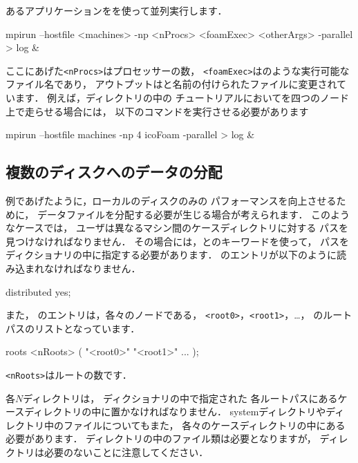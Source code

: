 あるアプリケーションをを使って並列実行します．
\begin{OFverbatim}[terminal]
mpirun --hostfile <machines> -np <nProcs>
    <foamExec> <otherArgs> -parallel > log &
\end{OFverbatim}
ここにあげた\verb|<nProcs>|はプロセッサーの数，
\verb|<foamExec>|はのような実行可能なファイル名であり，
アウトプットはと名前の付けられたファイルに変更されています．
例えば，ディレクトリの中の
チュートリアルにおいてを四つのノード上で走らせる場合には，
以下のコマンドを実行させる必要があります
\begin{OFverbatim}[terminal]
mpirun --hostfile machines -np 4 icoFoam -parallel > log &
\end{OFverbatim}

\subsection{複数のディスクへのデータの分配}
\label{ssec:3.4.3}
例であげたように，ローカルのディスクのみの
パフォーマンスを向上させるために，
データファイルを分配する必要が生じる場合が考えられます．
このようなケースでは，
ユーザは異なるマシン間のケースディレクトリに対する
パスを見つけなければなりません．
その場合には，とのキーワードを使って，
パスをディクショナリの中に指定する必要があります．
%
%
のエントリが以下のように読み込まれなければなりません．
\begin{OFverbatim}[leftskip=3em]
distributed  yes;
\end{OFverbatim}
また，
%
%
のエントリは，各々のノードである，
\verb|<root0>|，\verb|<root1>|，\ldots，
のルートパスのリストとなっています．
\begin{OFverbatim}[leftskip=3em]
roots
<nRoots>
(
   "<root0>"
   "<root1>"
   ...
);
\end{OFverbatim}
\verb|<nRoots>|はルートの数です．

各$N$ディレクトリは，
ディクショナリの中で指定された
各ルートパスにあるケースディレクトリの中に置かなければなりません．
systemディレクトリやディレクトリ中のファイルについてもまた，
各々のケースディレクトリの中にある必要があります．
ディレクトリの中のファイル類は必要となりますが，
ディレクトリは必要のないことに注意してください．


